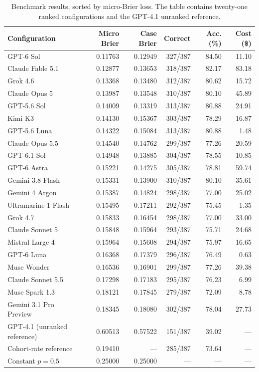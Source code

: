 \documentclass[11pt]{article}
\begin{document}
\begin{table}[tb]
\centering\small
\setlength{\tabcolsep}{4pt}
\begin{tabular}{lrrrrr}\toprule
Configuration & Micro Brier & Case Brier & Correct & Acc. (\%) & Cost (\$)\\\midrule
GPT-6 Sol & 0.11763 & 0.12949 & 327/387 & 84.50 & 11.10 \\
Claude Fable 5.1 & 0.12877 & 0.13653 & 318/387 & 82.17 & 83.18 \\
Grok 4.6 & 0.13368 & 0.13480 & 312/387 & 80.62 & 15.72 \\
Claude Opus 5 & 0.13987 & 0.13548 & 310/387 & 80.10 & 45.89 \\
GPT-5.6 Sol & 0.14009 & 0.13319 & 313/387 & 80.88 & 24.91 \\
Kimi K3 & 0.14130 & 0.15367 & 303/387 & 78.29 & 16.87 \\
GPT-5.6 Luna & 0.14322 & 0.15084 & 313/387 & 80.88 & 1.48 \\
Claude Opus 5.5 & 0.14540 & 0.14762 & 299/387 & 77.26 & 20.59 \\
GPT-6.1 Sol & 0.14948 & 0.13885 & 304/387 & 78.55 & 10.85 \\
GPT-6 Astra & 0.15221 & 0.14275 & 305/387 & 78.81 & 59.74 \\
Gemini 3.8 Flash & 0.15331 & 0.13900 & 310/387 & 80.10 & 35.61 \\
Gemini 4 Argon & 0.15387 & 0.14824 & 298/387 & 77.00 & 25.02 \\
Ultramarine 1 Flash & 0.15495 & 0.17211 & 292/387 & 75.45 & 1.35 \\
Grok 4.7 & 0.15833 & 0.16454 & 298/387 & 77.00 & 33.00 \\
Claude Sonnet 5 & 0.15848 & 0.15964 & 293/387 & 75.71 & 24.68 \\
Mistral Large 4 & 0.15964 & 0.15608 & 294/387 & 75.97 & 16.65 \\
GPT-6 Luna & 0.16368 & 0.17379 & 296/387 & 76.49 & 0.63 \\
Muse Wonder & 0.16536 & 0.16901 & 299/387 & 77.26 & 39.38 \\
Claude Sonnet 5.5 & 0.17298 & 0.17183 & 295/387 & 76.23 & 6.99 \\
Muse Spark 1.3 & 0.18121 & 0.17845 & 279/387 & 72.09 & 8.78 \\
Gemini 3.1 Pro Preview & 0.18345 & 0.18080 & 302/387 & 78.04 & 27.73 \\
\midrule
GPT-4.1 (unranked reference) & 0.60513 & 0.57522 & 151/387 & 39.02 & --- \\
Cohort-rate reference & 0.19410 & --- & 285/387 & 73.64 & ---\\
Constant $p=0.5$ & 0.25000 & 0.25000 & --- & --- & ---\\
\bottomrule\end{tabular}
\caption{Benchmark results, sorted by micro-Brier loss. The table contains twenty-one ranked configurations and the GPT-4.1 unranked reference.}
\label{tab:main}
\end{table}
\end{document}
